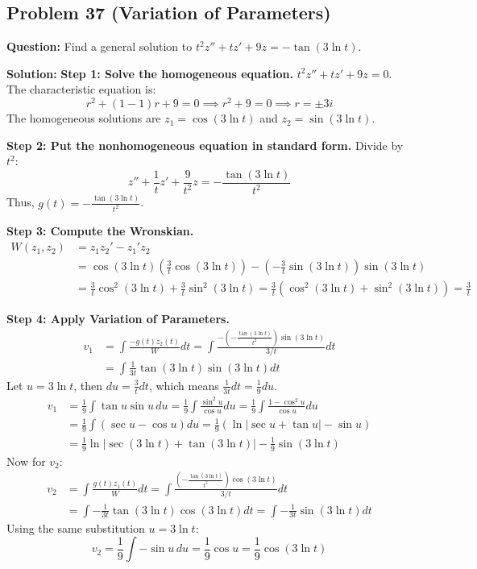 \documentclass{article}
\begin{document}
\subsection{Problem 37 (Variation of Parameters)}
\textbf{Question:} Find a general solution to $t^2 z'' + tz' + 9z = -\tan(3 \ln t)$.

\textbf{Solution:}
\textbf{Step 1: Solve the homogeneous equation.}
$t^2 z'' + tz' + 9z = 0$. The characteristic equation is:
\[ r^2 + (1 - 1)r + 9 = 0 \implies r^2 + 9 = 0 \implies r = \pm 3i \]
The homogeneous solutions are $z_1 = \cos(3 \ln t)$ and $z_2 = \sin(3 \ln t)$.

\textbf{Step 2: Put the nonhomogeneous equation in standard form.}
Divide by $t^2$:
\[ z'' + \frac{1}{t}z' + \frac{9}{t^2}z = -\frac{\tan(3 \ln t)}{t^2} \]
Thus, $g(t) = -\frac{\tan(3 \ln t)}{t^2}$.

\textbf{Step 3: Compute the Wronskian.}
\begin{align*}
W(z_1, z_2) &= z_1 z_2' - z_1' z_2 \\
&= \cos(3 \ln t) \left( \frac{3}{t} \cos(3 \ln t) \right) - \left( -\frac{3}{t} \sin(3 \ln t) \right) \sin(3 \ln t) \\
&= \frac{3}{t} \cos^2(3 \ln t) + \frac{3}{t} \sin^2(3 \ln t) = \frac{3}{t} (\cos^2(3 \ln t) + \sin^2(3 \ln t)) = \frac{3}{t}
\end{align*}

\textbf{Step 4: Apply Variation of Parameters.}
\begin{align*}
v_1 &= \int \frac{-g(t)z_2(t)}{W} dt = \int \frac{-\left(-\frac{\tan(3 \ln t)}{t^2}\right) \sin(3 \ln t)}{3/t} dt \\
&= \int \frac{1}{3t} \tan(3 \ln t) \sin(3 \ln t) dt
\end{align*}
Let $u = 3 \ln t$, then $du = \frac{3}{t} dt$, which means $\frac{1}{3t} dt = \frac{1}{9} du$.
\begin{align*}
v_1 &= \frac{1}{9} \int \tan u \sin u \, du = \frac{1}{9} \int \frac{\sin^2 u}{\cos u} du = \frac{1}{9} \int \frac{1 - \cos^2 u}{\cos u} du \\
&= \frac{1}{9} \int (\sec u - \cos u) du = \frac{1}{9} (\ln|\sec u + \tan u| - \sin u) \\
&= \frac{1}{9} \ln|\sec(3 \ln t) + \tan(3 \ln t)| - \frac{1}{9} \sin(3 \ln t)
\end{align*}
Now for $v_2$:
\begin{align*}
v_2 &= \int \frac{g(t)z_1(t)}{W} dt = \int \frac{\left(-\frac{\tan(3 \ln t)}{t^2}\right) \cos(3 \ln t)}{3/t} dt \\
&= \int -\frac{1}{3t} \tan(3 \ln t) \cos(3 \ln t) dt = \int -\frac{1}{3t} \sin(3 \ln t) dt
\end{align*}
Using the same substitution $u = 3 \ln t$:
\[ v_2 = \frac{1}{9} \int -\sin u \, du = \frac{1}{9} \cos u = \frac{1}{9} \cos(3 \ln t) \]
\end{document}
